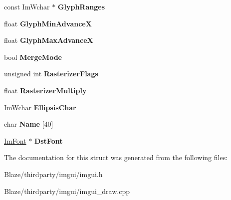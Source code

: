 \begin{DoxyCompactItemize}
const Im\+Wchar $\ast$ {\bfseries Glyph\+Ranges}
\item 
\mbox{\label{structImFontConfig_a3015c4ad464a7b5abeb5b926e8896bf6}} 
float {\bfseries Glyph\+Min\+AdvanceX}
\item 
\mbox{\label{structImFontConfig_af9040efaa5998aef3add4b629d7dc255}} 
float {\bfseries Glyph\+Max\+AdvanceX}
\item 
\mbox{\label{structImFontConfig_ad5cab281622e5bdec8e2d55cadc5601e}} 
bool {\bfseries Merge\+Mode}
\item 
\mbox{\label{structImFontConfig_a80d05eea7733731a3e9ac1d9e905e5b3}} 
unsigned int {\bfseries Rasterizer\+Flags}
\item 
\mbox{\label{structImFontConfig_a9365265cc52098a8ecf89ff47f6106f2}} 
float {\bfseries Rasterizer\+Multiply}
\item 
\mbox{\label{structImFontConfig_af58c73936500737189bbcfa3480f8c3c}} 
Im\+Wchar {\bfseries Ellipsis\+Char}
\item 
\mbox{\label{structImFontConfig_a12d3c014914d3b77533e219a013dc750}} 
char {\bfseries Name} \mbox{[}40\mbox{]}
\item 
\mbox{\label{structImFontConfig_a561773c311f6cf6de00642c2801e7b92}} 
\hyperlink{structImFont}{Im\+Font} $\ast$ {\bfseries Dst\+Font}
\end{DoxyCompactItemize}


The documentation for this struct was generated from the following files\+:\begin{DoxyCompactItemize}
\item 
Blaze/thirdparty/imgui/imgui.\+h\item 
Blaze/thirdparty/imgui/imgui\+\_\+draw.\+cpp\end{DoxyCompactItemize}
